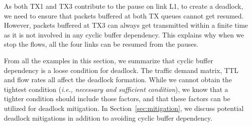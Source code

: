 As both TX1 and TX3 contribute to the pause on link L1, to create a deadlock, we need to ensure that
packets buffered at both TX queues cannot get resumed. However, packets buffered at TX3 can always get
transmitted within a finite time as it is not involved in any cyclic buffer dependency. This explains
why when we stop the flows, all the four links can be resumed from the pauses.
\fi


 From all the examples in this section, we summarize that cyclic buffer dependency is
 a loose condition for deadlock. The traffic demand matrix, TTL and flow rates all affect the deadlock
 formation. While we cannot obtain the tightest condition ({\em i.e., necessary and sufficient condition}),
we know that a tighter condition should include those factors, and that these factors can be utilized
for deadlock mitigation. In Section~\ref{sec:mitigation}, we discuss potential deadlock mitigations in
addition to avoiding cyclic buffer dependency.

